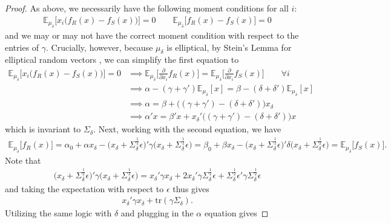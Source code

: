 \documentclass[11pt,dvipsnames]{article}
\newcommand{\trace}{\mathrm{tr}}
\begin{document}
\begin{appendix}
\reductionmulti*
\begin{proof}
As above, we necessarily have the following moment conditions for all $i$:
\begin{align*}
\mathbb{E}_{\mu_\delta}\big[x_i\big(f_R(x)-f_S(x)\big)\big] = 0 \qquad
\mathbb{E}_{\mu_\delta}\big[f_R(x)-f_S(x)\big] = 0
\end{align*}
and we may or may not have the correct moment condition with respect to the entries of $\gamma$. 
Crucially, however, because $\mu_\delta$ is elliptical, by Stein's Lemma for elliptical random vectors \citep{landsman2008stein}, we can simplify the first equation to
\begin{align*}
\mathbb{E}_{\mu_\delta}\big[x_i\big(f_R(x)-f_S(x)\big)\big] = 0
&\implies
\mathbb{E}_{\mu_\delta}\big[\frac{\partial}{\partial x_i}f_R(x)\big]
=
\mathbb{E}_{\mu_\delta}\big[\frac{\partial}{\partial x_i}f_S(x)\big] \qquad \forall i
\\
&\implies
\alpha - (\gamma+\gamma')\mathbb{E}_{\mu_\delta}[x]
=
\beta - (\delta+\delta')\mathbb{E}_{\mu_\delta}[x]
\\
&\implies
\alpha = \beta + \big((\gamma+\gamma')-(\delta+\delta')\big)x_\delta
\\
&\implies
\alpha'x = \beta'x + x_\delta'\big((\gamma+\gamma')-(\delta+\delta')\big)x
\end{align*}
which is invariant to $\Sigma_\delta$.
Next, working with the second equation, we have
\begin{align*}
\mathbb{E}_{\mu_\delta}\big[f_R(x)]
= \alpha_0 + \alpha x_\delta -\big(x_\delta + \Sigma_\delta^{\frac{1}{2}} \epsilon\big)'\gamma \big(x_\delta + \Sigma_\delta^{\frac{1}{2}} \epsilon\big)
= \beta_0 + \beta x_\delta -\big(x_\delta + \Sigma_\delta^{\frac{1}{2}} \epsilon\big)'\delta \big(x_\delta + \Sigma_\delta^{\frac{1}{2}} \epsilon\big)
=
\mathbb{E}_{\mu_\delta}\big[f_S(x)].
\end{align*}
Note that
\begin{align*}
\big(x_\delta + \Sigma_\delta^{\frac{1}{2}} \epsilon\big)'\gamma \big(x_\delta + \Sigma_\delta^{\frac{1}{2}} \epsilon\big)
= x_\delta'\gamma x_\delta + 2x_\delta'\gamma\Sigma_\delta^{\frac{1}{2}} \epsilon + \Sigma_\delta^{\frac{1}{2}}\epsilon'\gamma\Sigma_\delta^{\frac{1}{2}}\epsilon	
\end{align*}
and taking the expectation with respect to $\epsilon$ thus gives
\begin{align*}
x_\delta'\gamma x_\delta + \trace{(\gamma\Sigma_\delta)}	.
\end{align*}
Utilizing the same logic with $\delta$ and plugging in the $\alpha$ equation gives

\end{proof}
\end{appendix}
\end{document}
